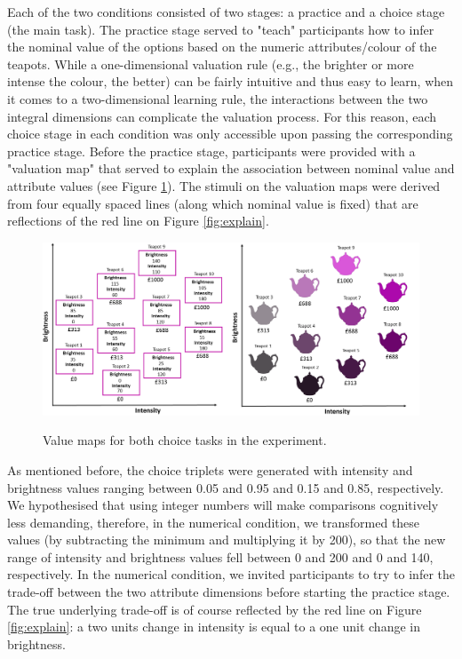 \documentclass[11pt,a4paper]{article}
\begin{document}
Each of the two conditions consisted of two stages: a practice and a choice stage (the main task). The practice stage served to "teach" participants how to infer the nominal value of the options based on the numeric attributes/colour of the teapots. While a one-dimensional valuation rule (e.g., the brighter or more intense the colour, the better) can be fairly intuitive and thus easy to learn, when it comes to a two-dimensional learning rule, the interactions between the two integral dimensions can complicate the valuation process. For this reason, each choice stage in each condition was only accessible upon passing the corresponding practice stage. Before the practice stage, participants  were provided with a "valuation map" that served to explain the association between nominal value and attribute values (see Figure \ref{fig:valuemaps}). The stimuli on the valuation maps were derived from four equally spaced lines (along which nominal value is fixed) that are reflections of the red line on Figure \ref{fig:explain}.


\begin{figure}
\centering
\caption{Value maps for both choice tasks in the experiment.}
\includegraphics[width=1\textwidth]{value_maps.png}
\label{fig:valuemaps}
\end{figure}

As mentioned before, the choice triplets were generated with intensity and brightness values ranging between 0.05 and 0.95 and 0.15 and 0.85, respectively.  We hypothesised that using integer numbers will make comparisons cognitively less demanding, therefore, in the numerical condition, we transformed these values (by subtracting the minimum and multiplying it by 200), so that the new range of intensity and brightness values fell between 0 and 200 and 0 and 140, respectively. In the numerical condition, we invited participants to try to infer the trade-off between the two attribute dimensions before starting the practice stage. The true underlying trade-off is of course reflected by the red line on Figure \ref{fig:explain}: a two units change in intensity is equal to a one unit change in brightness.
\end{document}
